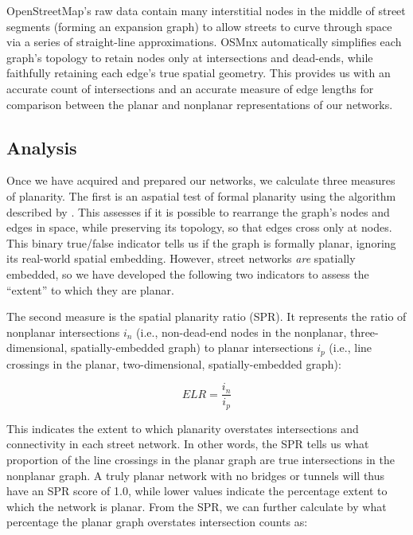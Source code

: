 \documentclass[Afour,sageh,times]{sagej}
\begin{document}
OpenStreetMap's raw data contain many interstitial nodes in the middle of street segments (forming an expansion graph) to allow streets to curve through space via a series of straight-line approximations. OSMnx automatically simplifies each graph's topology to retain nodes only at intersections and dead-ends, while faithfully retaining each edge's true spatial geometry. This provides us with an accurate count of intersections and an accurate measure of edge lengths for comparison between the planar and nonplanar representations of our networks.

\subsection{Analysis}

Once we have acquired and prepared our networks, we calculate three measures of planarity. The first is an aspatial test of formal planarity using the algorithm described by \citet{boyer_subgraph_2012}. This assesses if it is possible to rearrange the graph's nodes and edges in space, while preserving its topology, so that edges cross only at nodes. This binary true/false indicator tells us if the graph is formally planar, ignoring its real-world spatial embedding. However, street networks \emph{are} spatially embedded, so we have developed the following two indicators to assess the \enquote{extent} to which they are planar.

The second measure is the spatial planarity ratio (SPR). It represents the ratio of nonplanar intersections $i_n$ (i.e., non-dead-end nodes in the nonplanar, three-dimensional, spatially-embedded graph) to planar intersections $i_p$ (i.e., line crossings in the planar, two-dimensional, spatially-embedded graph): 

\begin{equation}
	\label{eq:spr}
	ELR = \frac{i_n}{i_p}
\end{equation}

This indicates the extent to which planarity overstates intersections and connectivity in each street network. In other words, the SPR tells us what proportion of the line crossings in the planar graph are true intersections in the nonplanar graph. A truly planar network with no bridges or tunnels will thus have an SPR score of 1.0, while lower values indicate the percentage extent to which the network is planar. From the SPR, we can further calculate by what percentage the planar graph overstates intersection counts as:
\end{document}

